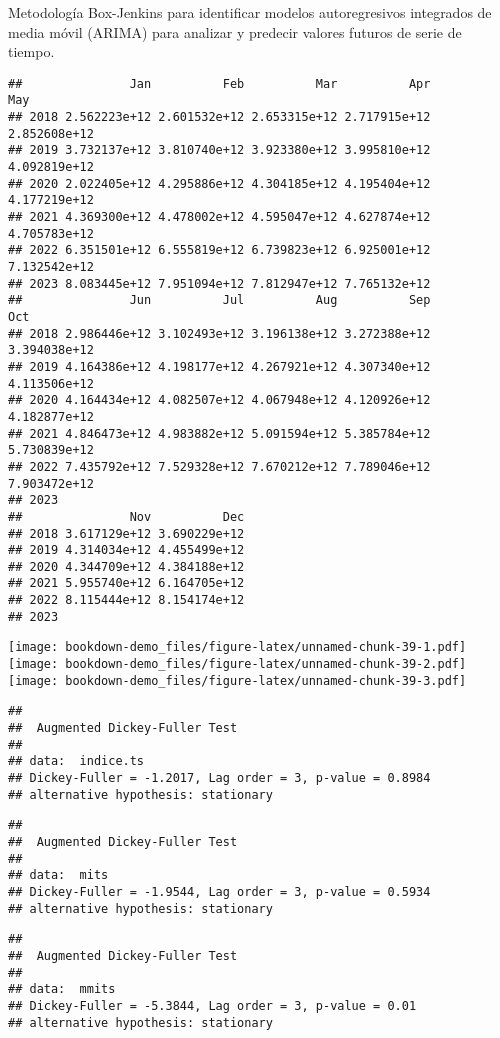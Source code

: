 \documentclass[
]{book}
\begin{document}
Metodología Box-Jenkins para identificar modelos autoregresivos integrados de media móvil (ARIMA) para analizar y predecir valores futuros de serie de tiempo.

\begin{verbatim}
##               Jan          Feb          Mar          Apr          May
## 2018 2.562223e+12 2.601532e+12 2.653315e+12 2.717915e+12 2.852608e+12
## 2019 3.732137e+12 3.810740e+12 3.923380e+12 3.995810e+12 4.092819e+12
## 2020 2.022405e+12 4.295886e+12 4.304185e+12 4.195404e+12 4.177219e+12
## 2021 4.369300e+12 4.478002e+12 4.595047e+12 4.627874e+12 4.705783e+12
## 2022 6.351501e+12 6.555819e+12 6.739823e+12 6.925001e+12 7.132542e+12
## 2023 8.083445e+12 7.951094e+12 7.812947e+12 7.765132e+12             
##               Jun          Jul          Aug          Sep          Oct
## 2018 2.986446e+12 3.102493e+12 3.196138e+12 3.272388e+12 3.394038e+12
## 2019 4.164386e+12 4.198177e+12 4.267921e+12 4.307340e+12 4.113506e+12
## 2020 4.164434e+12 4.082507e+12 4.067948e+12 4.120926e+12 4.182877e+12
## 2021 4.846473e+12 4.983882e+12 5.091594e+12 5.385784e+12 5.730839e+12
## 2022 7.435792e+12 7.529328e+12 7.670212e+12 7.789046e+12 7.903472e+12
## 2023                                                                 
##               Nov          Dec
## 2018 3.617129e+12 3.690229e+12
## 2019 4.314034e+12 4.455499e+12
## 2020 4.344709e+12 4.384188e+12
## 2021 5.955740e+12 6.164705e+12
## 2022 8.115444e+12 8.154174e+12
## 2023
\end{verbatim}

\texttt{[image: bookdown-demo\_files/figure-latex/unnamed-chunk-39-1.pdf]} \texttt{[image: bookdown-demo\_files/figure-latex/unnamed-chunk-39-2.pdf]} \texttt{[image: bookdown-demo\_files/figure-latex/unnamed-chunk-39-3.pdf]}

\begin{verbatim}
## 
##  Augmented Dickey-Fuller Test
## 
## data:  indice.ts
## Dickey-Fuller = -1.2017, Lag order = 3, p-value = 0.8984
## alternative hypothesis: stationary
\end{verbatim}

\begin{verbatim}
## 
##  Augmented Dickey-Fuller Test
## 
## data:  mits
## Dickey-Fuller = -1.9544, Lag order = 3, p-value = 0.5934
## alternative hypothesis: stationary
\end{verbatim}

\begin{verbatim}
## 
##  Augmented Dickey-Fuller Test
## 
## data:  mmits
## Dickey-Fuller = -5.3844, Lag order = 3, p-value = 0.01
## alternative hypothesis: stationary
\end{verbatim}
\end{document}
